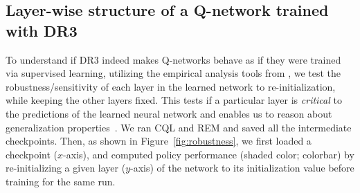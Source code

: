 \subsection{{Layer-wise structure of a Q-network trained with DR3}}
\label{app:layerwise}
\vspace{-0.05in}
To understand if DR3 indeed makes Q-networks behave as if they were trained via supervised learning, utilizing the empirical analysis tools from \citet{zhang2019all}, we test the robustness/sensitivity of each layer in the learned network to re-initialization, while keeping the other layers fixed. This tests if a particular layer is \emph{critical} to the predictions of the learned neural network and enables us to reason about generalization properties~\citep{zhang2019all,chatterji2019intriguing}. We ran CQL and REM and saved all the intermediate checkpoints. Then, as shown in Figure~\ref{fig:robustness}, we first loaded a checkpoint ($x$-axis), and computed policy performance (shaded color; colorbar)  by re-initializing a given layer ($y$-axis) of the network to its initialization value before training for the same run.

